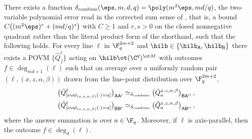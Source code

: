 \begin{lemma}
	\label{lem:qld-4-13}
	\notready
	There exists a function
	$\delta_{\mathrm{combine}}(\eps,m,d,q) = \poly(m^2\eps, md/q)$, the
	two-variable polynomial error read in the corrected sum sense of
	\cite{gap:qpbt_pasting-product-error}, that is, a bound
	$C\bigl((m^2\eps)^{r} + (md/q)^{s}\bigr)$ with $C \ge 1$ and $r, s > 0$ on
	the closed nonnegative quadrant rather than the literal product form of the
	shorthand, such that the following holds. For
	every line $\ell$ in $\F_q^{2m+2}$ and
	$\hilb \in \{\hilb_{\mathsf{A}}, \hilb_{\mathsf{B}}\}$ there exists a
	POVM $\{\hat{Q}^{\ell}_{f}\}$ acting on $\hilb \ot (\C^q)^{\ot M}$ with
	outcomes $f \in \deg_{md+1}(\ell)$ such that on average over a uniformly
	random pair $(\ell, (x,z,\alpha,\beta))$ drawn from the line-point
	distribution over $\F_q^{2m+2}$,
	\begin{gather}
		\label{eq:qld-4-13}
		\big(\hat{Q}^{\ell}
		_{[\mathrm{eval}_{(x,z,\alpha,\beta)}(\cdot)=a]}
		\big)_{\mathsf{A}\mathsf{A}'}
		\simeq_{\delta_{\mathrm{combine}}}
		\big(\hat{Q}^{x,z,\alpha,\beta}_{a}\big)_{\mathsf{B}\mathsf{A}''}\,,
		\\
		\big(\hat{Q}^{\ell}
		_{[\mathrm{eval}_{(x,z,\alpha,\beta)}(\cdot)=a]}
		\big)_{\mathsf{B}\mathsf{B}'}
		\simeq_{\delta_{\mathrm{combine}}}
		\big(\hat{Q}^{x,z,\alpha,\beta}_{a}\big)_{\mathsf{A}\mathsf{B}''}\,,
		\notag
	\end{gather}
	where the answer summation is over $a \in \F_q$. Moreover, if $\ell$ is
	axis-parallel, then the outcome $f \in \deg_{d}(\ell)$.
\end{lemma}

